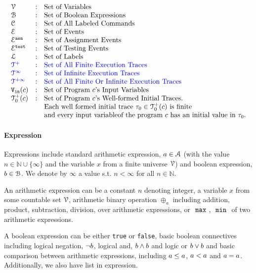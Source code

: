 \[
\begin{array}{lll}
\vardom & : & \mbox{Set of Variables}  
\\ 
%
\booldom & : & \mbox{Set of Boolean Expressions}  
\\ 
%
\cdom & : & \mbox{Set of All Labeled Commands} 
\\ 
%
\eventset  & : & \mbox{Set of Events}  
\\
%
\eventset^{\asn}  & : & \mbox{Set of Assignment Events}  
\\
%
\eventset^{\test}  & : & \mbox{Set of Testing Events}  
\\
%
\ldom  & : & \mbox{Set of Labels}  
\\
%
\highlight{\ftdom} & : & \mbox{\highlight{Set of All Finite Execution Traces}}
\\
\highlight{\inftdom} & : & \mbox{\highlight{Set of Infinite  Execution Traces}}
\\
\highlight{\tdom} & : & \mbox{\highlight{Set of All Finite Or Infinite  Execution Traces}}
\\ 
%
\inpvar(c) & : & \mbox{Set of Program $c$'s Input Variables}  
\\
%
\ftdom_0(c) & : & \mbox{Set of Program $c$'s Well-formed Initial Traces.}
\\ & & \mbox{Each well formed initial trace $\trace_0 \in \ftdom_0(c)$ is finite}
\\ & & \mbox{and every input variableof the program $c$ has an initial value in $\trace_0$.}
\end{array}
\]
%
\paragraph{Expression}
Expressions include
standard arithmetic expression, $a \in \mathcal{A}$ (with the value $n \in \mathbb{N} \cup \{ \infty\}$ and the variable $x$ from a finite universe $\mathcal{V}$) and boolean expression, $b \in \mathcal{B}$.
We denote by $\infty$ a value s.t. $n < \infty $ for all $n \in \mathbb{N}$.

An arithmetic expression can be a constant $n$ denoting integer, a variable $x$ from some countable set $\mathcal{V}$, arithmetic binary operation $\oplus_a$ including addition, product, subtraction, division, over arithmetic expressions, or
$~\mathtt{max}~$, $~\mathtt{min}~$ of two arithmetic expressions.

%
A boolean expression can be either {\tt true} or {\tt false}, basic boolean connectives including logical negation,  $\neg b$, logical and, $b \land b$ and logic or
$b \lor b$ and basic comparison between arithmetic expressions, 
including $a \leq a$, $a < a$ and
$a = a$.
Additionally, we also have list in expression.

